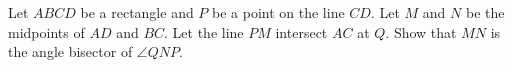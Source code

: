 Let $ABCD$ be a rectangle and $P$ be a point on the line $CD$.
Let $M$ and $N$ be the midpoints of $AD$ and $BC$. 
Let the line $PM$ intersect $AC$ at $Q$. Show that $MN$ is the angle bisector of $\angle QNP$.